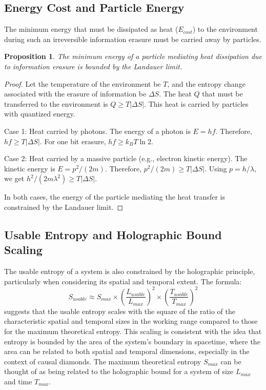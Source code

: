 \documentclass{article}
\newtheorem{proposition}{Proposition}
\begin{document}
		\subsection{Energy Cost and Particle Energy}
		The minimum energy that must be dissipated as heat ($E_{cost}$) to the environment during such an irreversible information erasure must be carried away by particles.
		
		\begin{proposition}
			The minimum energy of a particle mediating heat dissipation due to information erasure is bounded by the Landauer limit.
		\end{proposition}
		\begin{proof}
			Let the temperature of the environment be $T$, and the entropy change associated with the erasure of information be $\Delta S$. The heat $Q$ that must be transferred to the environment is $Q \ge T |\Delta S|$. This heat is carried by particles with quantized energy.
			
			Case 1: Heat carried by photons. The energy of a photon is $E = h f$. Therefore, $h f \ge T |\Delta S|$. For one bit erasure, $h f \ge k_B T \ln 2$.
			
			Case 2: Heat carried by a massive particle (e.g., electron kinetic energy). The kinetic energy is $E = p^2 / (2m)$. Therefore, $p^2 / (2m) \ge T |\Delta S|$. Using $p = h / \lambda$, we get $h^2 / (2 m \lambda^2) \ge T |\Delta S|$.
			
			In both cases, the energy of the particle mediating the heat transfer is constrained by the Landauer limit.
		\end{proof}
		
		\subsection{Usable Entropy and Holographic Bound Scaling}
		The usable entropy of a system is also constrained by the holographic principle, particularly when considering its spatial and temporal extent. The formula:
		\begin{equation}
			S_{usable} \approx S_{max} \times \left( \frac{L_{usable}}{L_{max}} \right)^2 \times \left( \frac{T_{usable}}{T_{max}} \right)^2
		\end{equation}
		suggests that the usable entropy scales with the square of the ratio of the characteristic spatial and temporal sizes in the working range compared to those for the maximum theoretical entropy. This scaling is consistent with the idea that entropy is bounded by the area of the system's boundary in spacetime, where the area can be related to both spatial and temporal dimensions, especially in the context of causal diamonds. The maximum theoretical entropy $S_{max}$ can be thought of as being related to the holographic bound for a system of size $L_{max}$ and time $T_{max}$.
		
\end{document}

